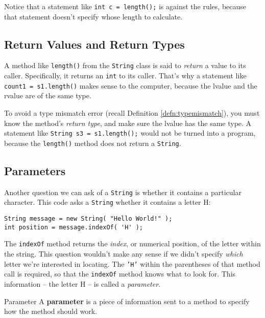 Notice that a statement like \texttt{int c = length();} is against the rules, because that statement doesn't specify whose length to calculate.

\subsection{Return Values and Return Types}
A method like \texttt{length()} from the \texttt{String} class is said to \textit{return} a value to its caller.  Specifically, it returns an \texttt{int} to its caller.  That's why a statement like \texttt{count1 = s1.length()} makes sense to the computer, because the lvalue and the rvalue are of the same type.

To avoid a type mismatch error (recall Definition \ref{defn:typemismatch}), you must know the method's \textit{return type}, and make sure the lvalue has the same type.  A statement like \texttt{String s3 = s1.length();} would not be turned into a program, because the \texttt{length()} method does not return a \texttt{String}.

\subsection{Parameters}
Another question we can ask of a \texttt{String} is whether it contains a particular character.  This code asks a \texttt{String} whether it contains a letter H:

\begin{verbatim}
String message = new String( "Hello World!" );
int position = message.indexOf( 'H' );
\end{verbatim}

The \texttt{indexOf} method returns the \textit{index}, or numerical position, of the letter within the string.  This question wouldn't make any sense if we didn't specify \textit{which} letter we're interested in locating.  The \texttt{'H'} within the parentheses of that method call is required, so that the \texttt{indexOf} method knows what to look for.  This information -- the letter H -- is called a \textit{parameter}.

\begin{defn}{Parameter}
A \textbf{parameter} is a piece of information sent to a method to specify how the method should work.
\end{defn}
